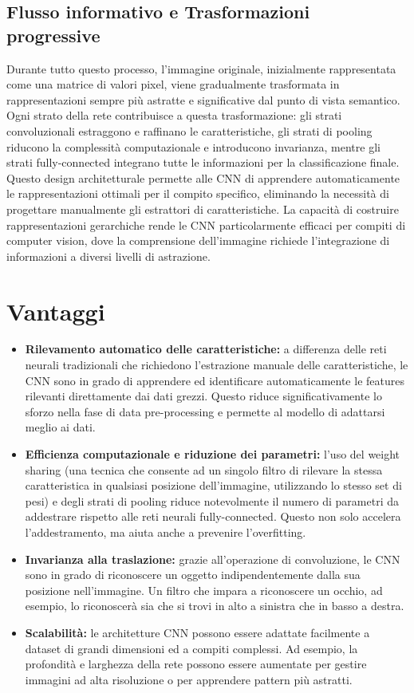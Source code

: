 \documentclass[a4paper,12pt]{report}
\begin{document}
	\subsection{Flusso informativo e Trasformazioni progressive}
	Durante tutto questo processo, l’immagine originale, inizialmente rappresentata come una matrice di valori pixel, viene gradualmente trasformata in rappresentazioni sempre più astratte e significative dal punto di vista semantico. Ogni strato della rete contribuisce a questa trasformazione: gli strati convoluzionali estraggono e raffinano le caratteristiche, gli strati di pooling riducono la complessità computazionale e introducono invarianza, mentre gli strati fully-connected integrano tutte le informazioni per la classificazione finale. \\
	Questo design architetturale permette alle CNN di apprendere automaticamente le rappresentazioni ottimali per il compito specifico, eliminando la necessità di progettare manualmente gli estrattori di caratteristiche. La capacità di costruire rappresentazioni gerarchiche rende le CNN particolarmente efficaci per compiti di computer vision, dove la comprensione dell’immagine richiede l’integrazione di informazioni a diversi livelli di astrazione.
	
	\section{Vantaggi}
	
	\begin{itemize}
		\item \textbf{Rilevamento automatico delle caratteristiche:} a differenza delle reti neurali tradizionali che richiedono l'estrazione manuale delle caratteristiche, le CNN sono in grado di apprendere ed identificare automaticamente le features rilevanti direttamente dai dati grezzi. Questo riduce significativamente lo sforzo nella fase di data pre-processing e permette al modello di adattarsi meglio ai dati.
		\item \textbf{Efficienza computazionale e riduzione dei parametri:} l'uso del weight sharing (una tecnica che consente ad un singolo filtro di rilevare la stessa caratteristica in qualsiasi posizione dell'immagine, utilizzando lo stesso set di pesi) e degli strati di pooling riduce notevolmente il numero di parametri da addestrare rispetto alle reti neurali fully-connected. Questo non solo accelera l'addestramento, ma aiuta anche a prevenire l'overfitting.
		\item \textbf{Invarianza alla traslazione:} grazie all'operazione di convoluzione, le CNN sono in grado di riconoscere un oggetto indipendentemente dalla sua posizione nell'immagine. Un filtro che impara a riconoscere un occhio, ad esempio, lo riconoscerà sia che si trovi in alto a sinistra che in basso a destra.
		\item \textbf{Scalabilità:} le architetture CNN possono essere adattate facilmente a dataset di grandi dimensioni ed a compiti complessi. Ad esempio, la profondità e larghezza della rete possono essere aumentate per gestire immagini ad alta risoluzione o per apprendere pattern più astratti.
	\end{itemize}
	
\end{document}

